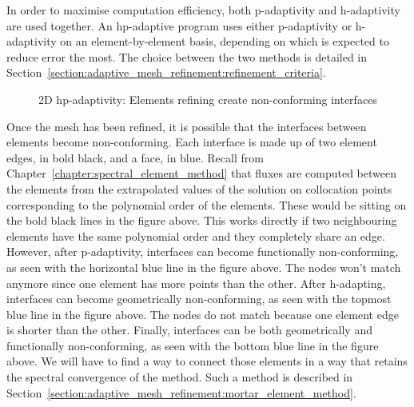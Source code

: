 In order to maximise computation efficiency, both p-adaptivity and h-adaptivity are used together.
An hp-adaptive program uses either p-adaptivity or h-adaptivity on an element-by-element basis,
depending on which is expected to reduce error the most. The choice between the two methods is
detailed in Section~\ref{section:adaptive_mesh_refinement:refinement_criteria}.

\begin{figure}[H]
	\centering
	
	\caption{2D hp-adaptivity: Elements refining create non-conforming interfaces}
	\label{fig:hp-adaptivity}
\end{figure}

Once the mesh has been refined, it is possible that the interfaces between elements become
non-conforming. Each interface is made up of two element edges, in bold black, and a face, in blue.
Recall from Chapter~\ref{chapter:spectral_element_method} that fluxes are computed between the
elements from the extrapolated values of the solution on collocation points corresponding to the
polynomial order of the elements. These would be sitting on the bold black lines in the figure
above. This works directly if two neighbouring elements have the same polynomial order and they
completely share an edge. However, after p-adaptivity, interfaces can become functionally
non-conforming, as seen with the horizontal blue line in the figure above. The nodes won't match
anymore since one element has more points than the other. After h-adapting, interfaces can become
geometrically non-conforming, as seen with the topmost blue line in the figure above. The nodes do
not match because one element edge is shorter than the other. Finally, interfaces can be both
geometrically and functionally non-conforming, as seen with the bottom blue line in the figure
above. We will have to find a way to connect those elements in a way that retains the spectral
convergence of the method. Such a method is described in
Section~\ref{section:adaptive_mesh_refinement:mortar_element_method}.


